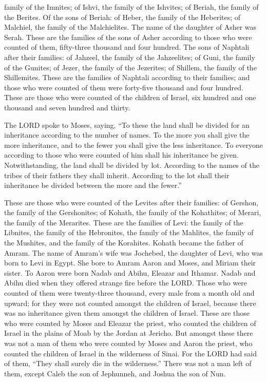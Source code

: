 family of the Imnites; of Ishvi, the family of the Ishvites; of Beriah,
the family of the Berites.  Of the sons of Beriah: of
Heber, the family of the Heberites; of Malchiel, the family of the
Malchielites.  The name of the daughter of Asher was
Serah.  These are the families of the sons of Asher
according to those who were counted of them, fifty-three thousand and
four hundred.  The sons of Naphtali after their families:
of Jahzeel, the family of the Jahzeelites; of Guni, the family of the
Gunites;  of Jezer, the family of the Jezerites; of
Shillem, the family of the Shillemites.  These are the
families of Naphtali according to their families; and those who were
counted of them were forty-five thousand and four hundred.
 These are those who were counted of the children of
Israel, six hundred and one thousand and seven hundred and thirty.

 The LORD spoke to Moses, saying,  ``To
these the land shall be divided for an inheritance according to the
number of names.  To the more you shall give the more
inheritance, and to the fewer you shall give the less inheritance. To
everyone according to those who were counted of him shall his
inheritance be given.  Notwithstanding, the land shall be
divided by lot. According to the names of the tribes of their fathers
they shall inherit.  According to the lot shall their
inheritance be divided between the more and the fewer.''

 These are those who were counted of the Levites after
their families: of Gershon, the family of the Gershonites; of Kohath,
the family of the Kohathites; of Merari, the family of the Merarites.
 These are the families of Levi: the family of the
Libnites, the family of the Hebronites, the family of the Mahlites, the
family of the Mushites, and the family of the Korahites. Kohath became
the father of Amram.  The name of Amram's wife was
Jochebed, the daughter of Levi, who was born to Levi in Egypt. She bore
to Amram Aaron and Moses, and Miriam their sister.  To
Aaron were born Nadab and Abihu, Eleazar and Ithamar. 
Nadab and Abihu died when they offered strange fire before the LORD.
 Those who were counted of them were twenty-three
thousand, every male from a month old and upward; for they were not
counted amongst the children of Israel, because there was no inheritance
given them amongst the children of Israel.  These are
those who were counted by Moses and Eleazar the priest, who counted the
children of Israel in the plains of Moab by the Jordan at Jericho.
 But amongst these there was not a man of them who were
counted by Moses and Aaron the priest, who counted the children of
Israel in the wilderness of Sinai.  For the LORD had said
of them, ``They shall surely die in the wilderness.'' There was not a
man left of them, except Caleb the son of Jephunneh, and Joshua the son
of Nun.

